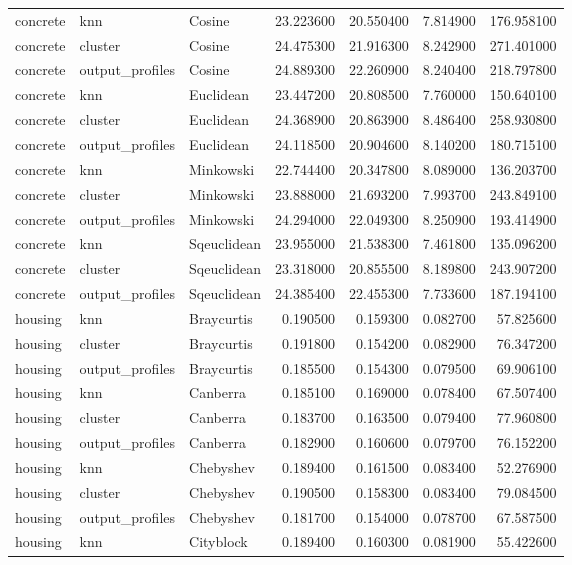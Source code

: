 \begin{tabular}{lllrrrr}
concrete & knn & Cosine & 23.223600 & 20.550400 & 7.814900 & 176.958100 \\
concrete & cluster & Cosine & 24.475300 & 21.916300 & 8.242900 & 271.401000 \\
concrete & output\_profiles & Cosine & 24.889300 & 22.260900 & 8.240400 & 218.797800 \\
concrete & knn & Euclidean & 23.447200 & 20.808500 & 7.760000 & 150.640100 \\
concrete & cluster & Euclidean & 24.368900 & 20.863900 & 8.486400 & 258.930800 \\
concrete & output\_profiles & Euclidean & 24.118500 & 20.904600 & 8.140200 & 180.715100 \\
concrete & knn & Minkowski & 22.744400 & 20.347800 & 8.089000 & 136.203700 \\
concrete & cluster & Minkowski & 23.888000 & 21.693200 & 7.993700 & 243.849100 \\
concrete & output\_profiles & Minkowski & 24.294000 & 22.049300 & 8.250900 & 193.414900 \\
concrete & knn & Sqeuclidean & 23.955000 & 21.538300 & 7.461800 & 135.096200 \\
concrete & cluster & Sqeuclidean & 23.318000 & 20.855500 & 8.189800 & 243.907200 \\
concrete & output\_profiles & Sqeuclidean & 24.385400 & 22.455300 & 7.733600 & 187.194100 \\
housing & knn & Braycurtis & 0.190500 & 0.159300 & 0.082700 & 57.825600 \\
housing & cluster & Braycurtis & 0.191800 & 0.154200 & 0.082900 & 76.347200 \\
housing & output\_profiles & Braycurtis & 0.185500 & 0.154300 & 0.079500 & 69.906100 \\
housing & knn & Canberra & 0.185100 & 0.169000 & 0.078400 & 67.507400 \\
housing & cluster & Canberra & 0.183700 & 0.163500 & 0.079400 & 77.960800 \\
housing & output\_profiles & Canberra & 0.182900 & 0.160600 & 0.079700 & 76.152200 \\
housing & knn & Chebyshev & 0.189400 & 0.161500 & 0.083400 & 52.276900 \\
housing & cluster & Chebyshev & 0.190500 & 0.158300 & 0.083400 & 79.084500 \\
housing & output\_profiles & Chebyshev & 0.181700 & 0.154000 & 0.078700 & 67.587500 \\
housing & knn & Cityblock & 0.189400 & 0.160300 & 0.081900 & 55.422600 \\

\end{tabular}
